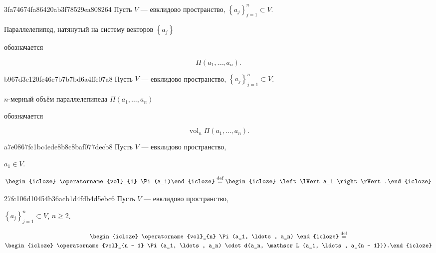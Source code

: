 \begin{note}{3fa74674fa86420ab3f78529ea808264}
    Пусть \({ V }\) --- евклидово пространство, \({ \left\{ a_j \right\}_{j = 1}^{n} \subset V }\).
    \begin{icloze}{2}Параллелепипед, натянутый на систему векторов \({ \left\{ a_j \right\} }\)\end{icloze} обозначается
    \begin{icloze}{1}
        \[
            \Pi (a_1, \ldots, a_n).
        \]
    \end{icloze}
\end{note}

\begin{note}{b967d3e120fc46c7b7b7bd6a4ffe07a8}
    Пусть \({ V }\) --- евклидово пространство, \({ \left\{ a_j \right\}_{j = 1}^{n} \subset V }\).
    \begin{icloze}{2}\({ n }\)-мерный объём параллелепипеда \({ \Pi (a_1, \ldots, a_n) }\)\end{icloze} обозначается
    \begin{icloze}{1}
        \[
            \operatorname{vol}_{n} \Pi(a_1, \ldots, a_n).
        \]
    \end{icloze}
\end{note}

\begin{note}{a7e0867fc1bc4ede8b8c8baf077decb8}
    Пусть \({ V }\) --- евклидово пространство, \begin{icloze}{3}\({ a_1 \in V }\).\end{icloze}
    \[
        \begin{icloze}{2}\operatorname{vol}_{1} \Pi(a_1)\end{icloze} \overset{\text{def}}= \begin{icloze}{1}\left\lVert a_1 \right\rVert.\end{icloze}
    \]
\end{note}

\begin{note}{27fc106d10454b36acb1d4fdb4d5ebc6}
    Пусть \({ V }\) --- евклидово пространство, \begin{icloze}{3}\({ \left\{ a_j \right\}_{j = 1}^{n} \subset V }\), \({ n \geqslant 2 }\).\end{icloze}
    \begin{multline*}
        \begin{icloze}{2}\operatorname{vol}_{n} \Pi(a_1, \ldots, a_n) \end{icloze}
        \overset{\text{def}}= \\
        \begin{icloze}{1}\operatorname{vol}_{n - 1} \Pi(a_1, \ldots, a_n) \cdot d(a_n, \mathscr L (a_1, \ldots, a_{n - 1})).\end{icloze}
    \end{multline*}
\end{note}

